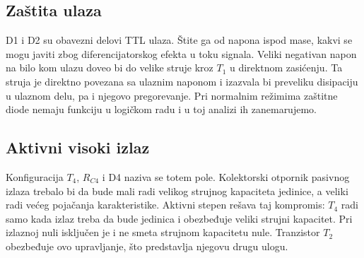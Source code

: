 \subsection*{Zaštita ulaza}
D1 i D2 su obavezni delovi TTL ulaza. Štite ga od napona ispod mase, kakvi se mogu javiti zbog diferencijatorskog efekta u toku signala. Veliki negativan napon na bilo kom ulazu doveo bi do velike struje kroz $T_1$ u direktnom zasićenju. Ta struja je direktno povezana sa ulaznim naponom i izazvala bi preveliku disipaciju u ulaznom delu, pa i njegovo pregorevanje. Pri normalnim režimima zaštitne diode nemaju funkciju u logičkom radu i u toj analizi ih zanemarujemo.

\subsection*{Aktivni visoki izlaz}
Konfiguracija $T_4$, $R_{C4}$ i D4 naziva se totem pole. Kolektorski otpornik pasivnog izlaza trebalo bi da bude mali radi velikog strujnog kapaciteta jedinice, a veliki radi većeg pojačanja karakteristike. Aktivni stepen rešava taj kompromis: $T_4$ radi samo kada izlaz treba da bude jedinica i obezbeđuje veliki strujni kapacitet. Pri izlaznoj nuli isključen je i ne smeta strujnom kapacitetu nule. Tranzistor $T_2$ obezbeđuje ovo upravljanje, što predstavlja njegovu drugu ulogu.
